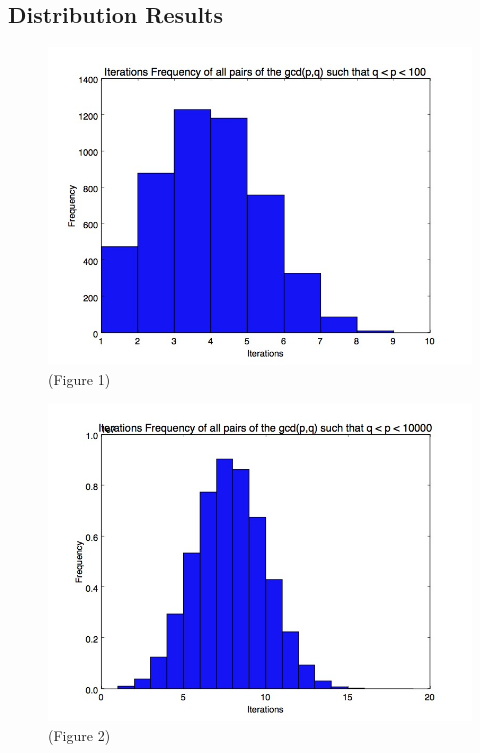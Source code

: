 \documentclass{beamer}
\begin{document}
\subsection{Distribution Results}
\begin{frame}
\begin{figure}
		
		\center \includegraphics[scale=.3]{2digit_iterationfreq.jpg}
		\center \tiny(Figure 1)
\end{figure}


\end{frame}

\begin{frame}
\begin{figure}
		
		\center \includegraphics[scale=.3]{4digit_iteration_freq.jpg}
		\center \tiny(Figure 2)
\end{figure}


\end{frame}
\end{document}
